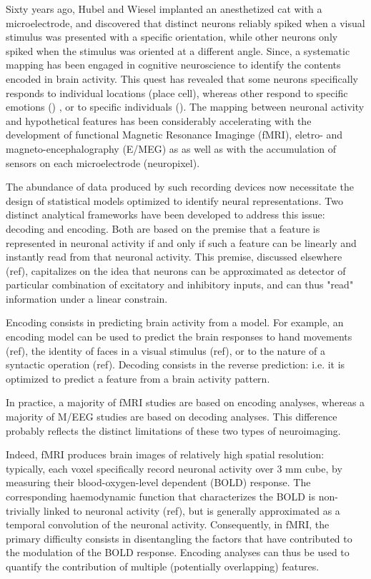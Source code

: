 Sixty years ago, Hubel and Wiesel implanted an anesthetized cat with a microelectrode, and discovered that distinct neurons reliably spiked when a visual stimulus was presented with a specific orientation, while other neurons only spiked when the stimulus was oriented at a different angle. Since, a systematic mapping has been engaged in cognitive neuroscience to identify the contents encoded in brain activity. This quest has revealed that some neurons specifically responds to individual locations (place cell), whereas other respond to specific emotions () , or to specific individuals (). The mapping between neuronal activity and hypothetical features has been considerably accelerating with the development of functional Magnetic Resonance Imaginge (fMRI), eletro- and magneto-encephalography (E/MEG) as as well as with the accumulation of sensors on each microelectrode (neuropixel).

The abundance of data produced by such recording devices now necessitate the design of statistical models optimized to identify neural representations. Two distinct analytical frameworks have been developed to address this issue: decoding and encoding. Both are based on the premise that a feature is represented in neuronal activity if and only if such a feature can be linearly and instantly read from that neuronal activity. This premise, discussed elsewhere (ref), capitalizes on the idea that neurons can be approximated as detector of particular combination of excitatory and inhibitory inputs, and can thus "read" information under a linear constrain.

Encoding consists in predicting brain activity from a model. For example, an encoding model can be used to predict the brain responses to hand movements (ref), the identity of faces in a visual stimulus (ref), or to the nature of a syntactic operation (ref).
Decoding consists in the reverse prediction: i.e. it is optimized to predict a feature from a brain activity pattern.

In practice, a majority of fMRI studies are based on encoding analyses, whereas a majority of M/EEG studies are based on decoding analyses. This difference probably reflects the distinct limitations of these two types of neuroimaging.

Indeed, fMRI produces brain images of relatively high spatial resolution: typically, each voxel specifically record neuronal activity over 3 mm cube, by measuring their blood-oxygen-level dependent (BOLD) response. The corresponding haemodynamic function that characterizes the BOLD is non-trivially linked to neuronal activity (ref), but is generally approximated as a temporal convolution of the neuronal activity. Consequently, in fMRI, the primary difficulty consists in disentangling the factors that have contributed to the modulation of the BOLD response. Encoding analyses can thus be used to quantify the contribution of multiple (potentially overlapping) features.

